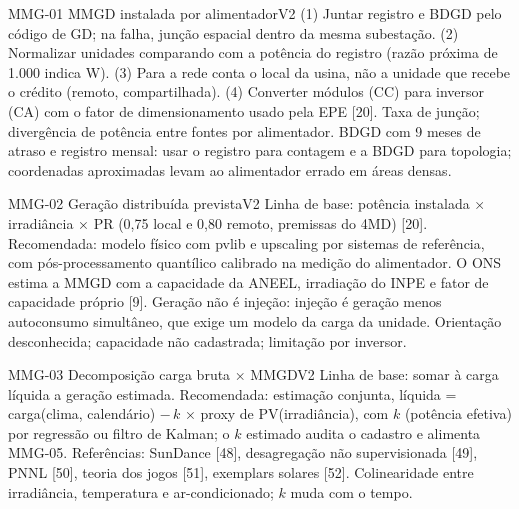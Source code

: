 \begin{ficha}{MMG-01 \textperiodcentered{} MMGD instalada por alimentador}{V2}
 (1) Juntar registro e BDGD pelo código de GD; na falha,
junção espacial dentro da mesma subestação. (2) Normalizar unidades
comparando com a potência do registro (razão próxima de 1.000 indica W). (3)
Para a rede conta o local da usina, não a unidade que recebe o crédito
(remoto, compartilhada). (4) Converter módulos (CC) para inversor (CA) com o
fator de dimensionamento usado pela EPE [20].
 Taxa de junção; divergência de potência entre fontes por
alimentador.
 BDGD com 9 meses de atraso e registro mensal: usar o
registro para contagem e a BDGD para topologia; coordenadas aproximadas levam
ao alimentador errado em áreas densas.
\end{ficha}

\begin{ficha}{MMG-02 \textperiodcentered{} Geração distribuída prevista}{V2}
 Linha de base: potência instalada × irradiância × PR (0,75
local e 0,80 remoto, premissas do 4MD) [20]. Recomendada: modelo físico com
pvlib e upscaling por sistemas de referência, com pós-processamento
quantílico calibrado na medição do alimentador. O ONS estima a MMGD com a
capacidade da ANEEL, irradiação do INPE e fator de capacidade próprio [9].
 Geração não é injeção: injeção é geração menos
autoconsumo simultâneo, que exige um modelo da carga da unidade.
 Orientação desconhecida; capacidade não cadastrada;
limitação por inversor.
\end{ficha}

\begin{ficha}{MMG-03 \textperiodcentered{} Decomposição carga bruta × MMGD}{V2}
 Linha de base: somar à carga líquida a geração estimada.
Recomendada: estimação conjunta, líquida = carga(clima, calendário) $-\,k$ ×
proxy de PV(irradiância), com $k$ (potência efetiva) por regressão ou filtro
de Kalman; o $k$ estimado audita o cadastro e alimenta MMG-05. Referências:
SunDance [48], desagregação não supervisionada [49], PNNL [50], teoria dos
jogos [51], exemplars solares [52].
 Colinearidade entre irradiância, temperatura e
ar-condicionado; $k$ muda com o tempo.
\end{ficha}

